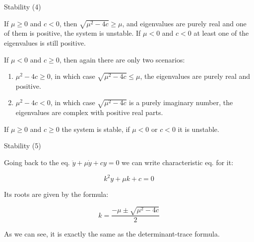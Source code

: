 \documentclass{beamer}
\begin{document}
\begin{frame}{Stability (4)}
\begin{flushleft}


If $\mu \geq 0$ and $c < 0$, then $\sqrt{\mu^2 - 4c} \geq \mu$, and eigenvalues are purely real and one of them is positive, the system is unstable. If $\mu < 0$ and $c < 0$ at least one of the eigenvalues is still positive.

\bigskip

If $\mu < 0$ and $c \geq 0$, then again there are only two scenarios: 

\begin{enumerate}
    \item $\mu^2 - 4c \geq 0$, in which case $\sqrt{\mu^2 - 4c} \leq \mu$, the eigenvalues are purely real and positive.
    \item $\mu^2 - 4c < 0$, in which case $\sqrt{\mu^2 - 4c}$ is a purely imaginary number, the eigenvalues are complex with positive real parts.
\end{enumerate}

\begin{definition}
If $\mu \geq 0$ and $c \geq 0$ the system is stable, if $\mu < 0$ or $c < 0$ it is unstable.
\end{definition}

\end{flushleft}
\end{frame}




\begin{frame}{Stability (5)}
\begin{flushleft}

Going back to the eq. $\ddot y + \mu \dot y + c y = 0$ we can write characteristic eq. for it:

\begin{equation}
    k^2 y + \mu k + c = 0
\end{equation}

Its roots are given by the formula:

\begin{equation}
    k = \frac{-\mu \pm \sqrt{\mu^2 - 4c} }{2}
\end{equation}

As we can see, it is exactly the same as the determinant-trace formula.


\end{flushleft}
\end{frame}
\end{document}
